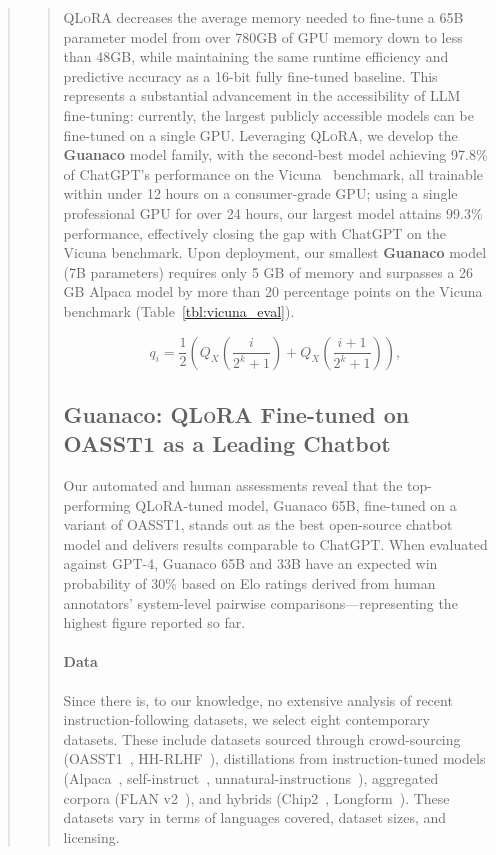 \begin{quote}
\begin{quote}
\textsc{QLoRA} decreases the average memory needed to fine-tune a 65B parameter model from over 780GB of GPU memory down to less than 48GB, while maintaining the same runtime efficiency and predictive accuracy as a 16-bit fully fine-tuned baseline. This represents a substantial advancement in the accessibility of LLM fine-tuning: currently, the largest publicly accessible models can be fine-tuned on a single GPU. Leveraging \textsc{QLoRA}, we develop the \textbf{Guanaco} model family, with the second-best model achieving 97.8\% of ChatGPT’s performance on the Vicuna~\citep{vicuna2023} benchmark, all trainable within under 12 hours on a consumer-grade GPU; using a single professional GPU for over 24 hours, our largest model attains 99.3\% performance, effectively closing the gap with ChatGPT on the Vicuna benchmark. Upon deployment, our smallest \textbf{Guanaco} model (7B parameters) requires only 5 GB of memory and surpasses a 26 GB Alpaca model by more than 20 percentage points on the Vicuna benchmark (Table~\ref{tbl:vicuna_eval}).

\begin{equation}
q_i  = \frac{1}{2}\left( Q_X\left(\frac{i}{2^k+1}\right) + Q_X\left(\frac{i+1}{2^k+1}\right)\right),
\end{equation}

\subsection{\textbf{Guanaco}: \textsc{QLoRA} Fine-tuned on OASST1 as a Leading Chatbot} Our automated and human assessments reveal that the top-performing \textsc{QLoRA}-tuned model, {Guanaco} 65B, fine-tuned on a variant of OASST1, stands out as the best open-source chatbot model and delivers results comparable to ChatGPT. When evaluated against GPT-4, {Guanaco} 65B and 33B have an expected win probability of 30\% based on Elo ratings derived from human annotators’ system-level pairwise comparisons—representing the highest figure reported so far.

\paragraph{Data} Since there is, to our knowledge, no extensive analysis of recent instruction-following datasets, we select eight contemporary datasets. These include datasets sourced through crowd-sourcing (OASST1~\citep{kopf2023openassistant}, HH-RLHF~\citep{bai2022training}), distillations from instruction-tuned models (Alpaca~\citep{alpaca}, self-instruct~\citep{wang2022self}, unnatural-instructions~\citep{honovich2022unnatural}), aggregated corpora (FLAN v2~\citep{chung2022scaling}), and hybrids (Chip2~\citep{laion2023}, Longform~\citep{koksal2023longform}). These datasets vary in terms of languages covered, dataset sizes, and licensing.


\end{quote}
\end{quote}
